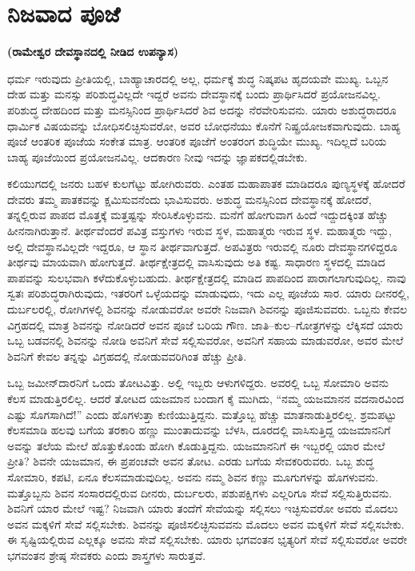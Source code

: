 
\chapter{ನಿಜವಾದ ಪೂಜೆ}

\begin{center}
\textbf{(ರಾಮೇಶ್ವರ ದೇವಸ್ಥಾನದಲ್ಲಿ ನೀಡಿದ ಉಪನ್ಯಾಸ)}
\end{center}

ಧರ್ಮ ಇರುವುದು ಪ್ರೀತಿಯಲ್ಲಿ, ಬಾಹ್ಯಾಚಾರದಲ್ಲಿ ಅಲ್ಲ, ಧರ್ಮಕ್ಕೆ ಶುದ್ಧ ನಿಷ್ಕಪಟ ಹೃದಯವೇ ಮುಖ್ಯ. ಒಬ್ಬನ ದೇಹ ಮತ್ತು ಮನಸ್ಸು ಪರಿಶುದ್ಧವಿಲ್ಲದೇ ಇದ್ದರೆ ಅವನು ದೇವಸ್ಥಾನಕ್ಕೆ ಬಂದು ಪ್ರಾರ್ಥಿಸಿದರೆ ಪ್ರಯೋಜನವಿಲ್ಲ. ಪರಿಶುದ್ಧ ದೇಹದಿಂದ ಮತ್ತು ಮನಸ್ಸಿನಿಂದ ಪ್ರಾರ್ಥಿಸಿದರೆ ಶಿವ ಅದನ್ನು ನೆರವೇರಿಸುವನು. ಯಾರು ಅಶುದ್ಧರಾದರೂ ಧಾರ್ಮಿಕ ವಿಷಯವನ್ನು ಬೋಧಿಸಲಿಚ್ಛಿಸುವರೋ, ಅವರ ಬೋಧನೆಯು ಕೊನೆಗೆ ನಿಷ್ಪ್ರಯೋಜಕವಾಗುವುದು. ಬಾಹ್ಯ ಪೂಜೆ ಆಂತರಿಕ ಪೂಜೆಯ ಸಂಕೇತ ಮಾತ್ರ. ಆಂತರಿಕ ಪೂಜೆಗೆ ಅಂತರಂಗ ಶುದ್ಧಿಯೇ ಮುಖ್ಯ. ಇದಿಲ್ಲದೆ ಬರಿಯ ಬಾಹ್ಯ ಪೂಜೆಯಿಂದ ಪ್ರಯೋಜನವಿಲ್ಲ. ಆದಕಾರಣ ನೀವು ಇದನ್ನು ಜ್ಞಾಪಕದಲ್ಲಿಡಬೇಕು. 

ಕಲಿಯುಗದಲ್ಲಿ ಜನರು ಬಹಳ ಕುಲಗೆಟ್ಟು ಹೋಗಿರುವರು. ಎಂತಹ ಮಹಾಪಾತಕ ಮಾಡಿದರೂ ಪುಣ್ಯಸ್ಥಳಕ್ಕೆ ಹೋದರೆ ದೇವರು ತಮ್ಮ ಪಾತಕವನ್ನು ಕ್ಷಮಿಸುವನೆಂದು ಭಾವಿಸುವರು. ಅಶುದ್ಧ ಮನಸ್ಸಿನಿಂದ ದೇವಸ್ಥಾನಕ್ಕೆ ಹೋದರೆ, ತನ್ನಲ್ಲಿರುವ ಪಾಪದ ಮೊತ್ತಕ್ಕೆ ಮತ್ತಷ್ಟನ್ನು ಸೇರಿಸಿಕೊಳ್ಳುವನು. ಮನೆಗೆ ಹೋಗುವಾಗ ಹಿಂದೆ ಇದ್ದುದಕ್ಕಿಂತ ಹೆಚ್ಚು ಹೀನನಾಗಿರುತ್ತಾನೆ. ತೀರ್ಥವೆಂದರೆ ಪವಿತ್ರ ವಸ್ತುಗಳು ಇರುವ ಸ್ಥಳ, ಮಹಾತ್ಮರು ಇರುವ ಸ್ಥಳ. ಮಹಾತ್ಮರು ಇದ್ದು, ಅಲ್ಲಿ ದೇವಸ್ಥಾನವಿಲ್ಲದೇ ಇದ್ದರೂ, ಆ ಸ್ಥಾನ ತೀರ್ಥವಾಗುತ್ತದೆ. ಅಪವಿತ್ರರು ಇರುವಲ್ಲಿ ನೂರು ದೇವಸ್ಥಾನಗಳಿದ್ದರೂ ತೀರ್ಥವು ಮಾಯವಾಗಿ ಹೋಗುತ್ತದೆ. ತೀರ್ಥಕ್ಷೇತ್ರದಲ್ಲಿ ವಾಸಿಸುವುದು ಅತಿ ಕಷ್ಟ. ಸಾಧಾರಣ ಸ್ಥಳದಲ್ಲಿ ಮಾಡಿದ ಪಾಪವನ್ನು ಸುಲಭವಾಗಿ ಕಳೆದುಕೊಳ್ಳುಬಹುದು. ತೀರ್ಥಕ್ಷೇತ್ರದಲ್ಲಿ ಮಾಡಿದ ಪಾಪದಿಂದ ಪಾರಾಗಲಾಗುವುದಿಲ್ಲ. ನಾವು ಸ್ವತಃ ಪರಿಶುದ್ಧರಾಗಿರುವುದು, ಇತರರಿಗೆ ಒಳ್ಳೆಯದನ್ನು ಮಾಡುವುದು, ಇದು ಎಲ್ಲ ಪೂಜೆಯ ಸಾರ. ಯಾರು ದೀನರಲ್ಲಿ, ದುರ್ಬಲರಲ್ಲಿ, ರೋಗಿಗಳಲ್ಲಿ ಶಿವನನ್ನು ನೋಡುವರೋ ಅವರೇ ನಿಜವಾಗಿ ಶಿವನನ್ನು ಪೂಜಿಸುವವರು. ಒಬ್ಬನು ಕೇವಲ ವಿಗ್ರಹದಲ್ಲಿ ಮಾತ್ರ ಶಿವನನ್ನು ನೋಡಿದರೆ ಅವನ ಪೂಜೆ ಬರಿಯ ಗೌಣ. ಜಾತಿ–ಕುಲ–ಗೋತ್ರಗಳನ್ನು ಲೆಕ್ಕಿಸದೆ ಯಾರು ಒಬ್ಬ ಬಡವನಲ್ಲಿ ಶಿವನನ್ನು ನೋಡಿ ಅವನಿಗೆ ಸೇವೆ ಸಲ್ಲಿಸುವರೋ, ಅವನಿಗೆ ಸಹಾಯ ಮಾಡುವರೋ, ಅವರ ಮೇಲೆ ಶಿವನಿಗೆ ಕೇವಲ ತನ್ನನ್ನು ವಿಗ್ರಹದಲ್ಲಿ ನೋಡುವವರಿಗಿಂತ ಹೆಚ್ಚು ಪ್ರೀತಿ. 

ಒಬ್ಬ ಜಮೀನ್​ದಾರನಿಗೆ ಒಂದು ತೋಟವಿತ್ತು. ಅಲ್ಲಿ ಇಬ್ಬರು ಆಳುಗಳಿದ್ದರು. ಅವರಲ್ಲಿ ಒಬ್ಬ ಸೋಮಾರಿ ಅವನು ಕೆಲಸ ಮಾಡುತ್ತಿರಲಿಲ್ಲ. ಆದರೆ ತೋಟದ ಯಜಮಾನ ಬಂದಾಗ ಕೈ ಮುಗಿದು, “ನಮ್ಮ ಯಜಮಾನನ ವದನಾರವಿಂದ ಎಷ್ಟು ಸೊಗಸಾಗಿದೆ!” ಎಂದು ಹೊಗಳುತ್ತಾ ಕುಣಿಯುತ್ತಿದ್ದನು. ಮತ್ತೊಬ್ಬ ಹೆಚ್ಚು ಮಾತನಾಡುತ್ತಿರಲಿಲ್ಲ. ಶ್ರಮಪಟ್ಟು ಕೆಲಸಮಾಡಿ ಹಲವು ಬಗೆಯ ತರಕಾರಿ ಹಣ್ಣು ಮುಂತಾದುವನ್ನು ಬೆಳಸಿ, ದೂರದಲ್ಲಿ ವಾಸಿಸುತ್ತಿದ್ದ ಯಜಮಾನನಿಗೆ ಅವನ್ನು ತಲೆಯ ಮೇಲೆ ಹೊತ್ತುಕೊಂಡು ಹೋಗಿ ಕೊಡುತ್ತಿದ್ದನು. ಯಜಮಾನನಿಗೆ ಈ ಇಬ್ಬರಲ್ಲಿ ಯಾರ ಮೇಲೆ ಪ್ರೀತಿ? ಶಿವನೇ ಯಜಮಾನ, ಈ ಪ್ರಪಂಚವೇ ಅವನ ತೋಟ. ಎರಡು ಬಗೆಯ ಸೇವಕರಿರುವರು. ಒಬ್ಬ ಶುದ್ಧ ಸೋಮಾರಿ, ಕಪಟಿ, ಏನೂ ಕೆಲಸಮಾಡುವುದಿಲ್ಲ. ಅವನು ನಮ್ಮ ಶಿವನ ಕಣ್ಣು ಮೂಗುಗಳನ್ನು ಹೊಗಳುವನು. ಮತ್ತೊಬ್ಬನು ಶಿವನ ಸಂಸಾರದಲ್ಲಿರುವ ದೀನರು, ದುರ್ಬಲರು, ಪಶುಪಕ್ಷಿಗಳು ಎಲ್ಲರಿಗೂ ಸೇವೆ ಸಲ್ಲಿಸುತ್ತಿರುವನು. ಶಿವನಿಗೆ ಯಾರ ಮೇಲೆ ಇಷ್ಟ? ನಿಜವಾಗಿ ಯಾರು ತಂದೆಗೆ ಸೇವೆಯನ್ನು ಸಲ್ಲಿಸಲು ಇಚ್ಛಿಸುವರೋ ಅವರು ಮೊದಲು ಅವನ ಮಕ್ಕಳಿಗೆ ಸೇವೆ ಸಲ್ಲಿಸಬೇಕು. ಶಿವನನ್ನು ಪೂಜಿಸಲಿಚ್ಛಿಸುವವನು ಮೊದಲು ಅವನ ಮಕ್ಕಳಿಗೆ ಸೇವೆ ಸಲ್ಲಿಸಬೇಕು. ಈ ಸೃಷ್ಟಿಯಲ್ಲಿರುವ ಎಲ್ಲಕ್ಕೂ ಅವನು ಸೇವೆ ಸಲ್ಲಿಸಬೇಕು. ಯಾರು ಭಗವಂತನ ಭೃತ್ಯರಿಗೆ ಸೇವೆ ಸಲ್ಲಿಸುವರೋ ಅವರೇ ಭಗವಂತನ ಶ್ರೇಷ್ಠ ಸೇವಕರು ಎಂದು ಶಾಸ್ತ್ರಗಳು ಸಾರುತ್ತವೆ. 

